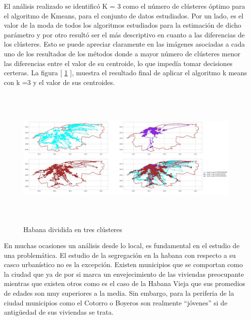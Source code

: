 El análisis realizado se identificó K = 3 como el número de clústeres óptimo para el algoritmo de Kmeans, para el conjunto de datos estudiados. Por un lado, es el valor de la moda de todos los algoritmos estudiados para la estimación de dicho parámetro y por otro resultó ser el más descriptivo en cuanto a las diferencias de los clústeres. Esto se puede apreciar claramente en las imágenes asociadas a cada uno de los resultados de los métodos donde a mayor número de clústeres menor las diferencias entre el valor de su centroide, lo que impedía tomar decisiones certeras. La figura [ \ref{fig:Conc} ], muestra el resultado final de aplicar el algoritmo k means con k =3 y el valor de sus centroides.

\begin{figure}[h!]
	\centering
	\includegraphics[width=15cm, height=7cm]{Images/Conclusion.jpg} 
	\caption{Habana dividida en tres clústeres}
	\label{fig:Conc}
\end{figure}

En muchas ocasiones un análisis desde lo local, es fundamental en el estudio de una problemática. El estudio de la segregación en la habana con respecto a su casco urbanístico no es la excepción. Existen municipios que se comportan como la ciudad que ya de por si marca un envejecimiento de las viviendas preocupante mientras que existen otros como es el caso de la Habana Vieja que sus promedios de edades son muy superiores a la media. Sin embargo, para la periferia de la ciudad municipios como el Cotorro o Boyeros son realmente “jóvenes” si de antigüedad de sus viviendas se trata.




